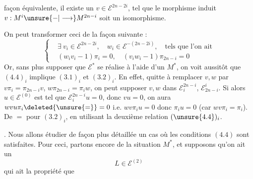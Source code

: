 façon équivalente, il existe un $v\in\mathcal E^{2n-2i}$, tel que le morphisme induit $v:M^i\unsure{-|\longrightarrow}M^{2n-i}$ soit un isomorphisme.

On peut transformer ceci de la façon suivante :
\[
\left\{\begin{aligned}
&\exists\ v_i\in\mathcal E^{2n-2i},\quad w_i\in\mathcal E^{-(2n-2i)},\quad\text{tels que l'on ait}\\
&(w_iv_i-1)\pi_i=0,\quad(v_iw_i-1)\pi_{2n-i}=0
\end{aligned}\right.
\tag*{$(4.4)_i$}
\]
Or, sans plus supposer que $\mathcal E^*$ se réalise à l'aide d'un $M^*$, on voit aussitôt que $(4.4)_i$ implique $(3.1)_i$ et $(3.2)_i$. En effet, quitte à remplacer $v,w$ par $v\pi_i=\pi_{2n-i}v$, $w\pi_{2n-i}=\pi_iw$, on peut supposer $v,w$ dans $\mathcal E_i^{2n-i}$, $\mathcal E_{2n-i}^i$. Si alors  $u\in\mathcal E^{(0)}$ est tel que $\mathcal E_i^{2n-i}u=0$, donc $vu=0$, on aura $wvu\pi_i\deleted{\unsure{=}}=0$ i.e. $wv\pi_i u=0$ donc $\pi_i u=0$ (car $wv\pi_i=\pi_i$). De $=$ pour $(3.2)_i$, en utilisant la deuxième relation $(\unsure{4.4})_i$.


. Nous allons étudier de façon plus détaillée un cas où les conditions $(4.4)$ sont satisfaites. Pour ceci, partons encore de la situation $M^*$,  et supposons qu'on ait un
\[
L\in\mathcal E^{(2)}
\tag{6.0}
\]
qui ait la propriété que
